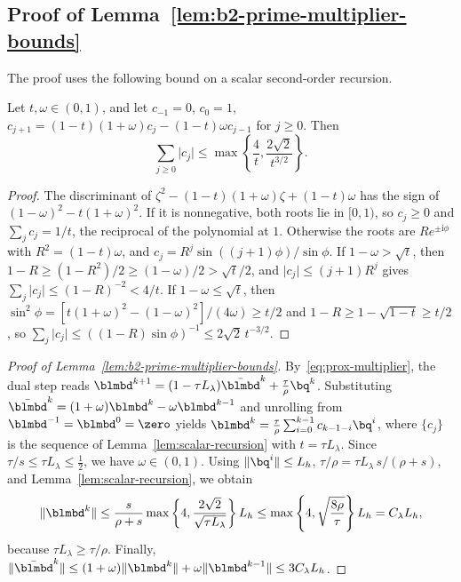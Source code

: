 \subsection{Proof of Lemma~\ref{lem:b2-prime-multiplier-bounds}}
\label{app:b2-prime-multiplier-bounds}

The proof uses the following bound on a scalar second-order recursion.

\begin{lemma}
\label{lem:scalar-recursion}
Let \(t,\omega\in(0,1)\), and let \(c_{-1}=0\), \(c_0=1\),
\(c_{j+1}=(1-t)(1+\omega)c_j-(1-t)\omega c_{j-1}\) for \(j\ge0\). Then
\[
    \sum_{j\ge0}\lvert c_j\rvert
    \le\max\left\{\frac4t,\frac{2\sqrt2}{t^{3/2}}\right\}.
\]
\end{lemma}

\begin{proof}
The discriminant of \(\zeta^2-(1-t)(1+\omega)\zeta+(1-t)\omega\) has the
sign of \((1-\omega)^2-t(1+\omega)^2\). If it is nonnegative, both roots
lie in \([0,1)\), so \(c_j\ge0\) and \(\sum_jc_j=1/t\), the reciprocal of
the polynomial at \(1\). Otherwise the roots are \(Re^{\pm\mathrm i\phi}\)
with \(R^2=(1-t)\omega\), and \(c_j=R^j\sin((j+1)\phi)/\sin\phi\).
If \(1-\omega>\sqrt t\), then \(1-R\ge(1-R^2)/2\ge(1-\omega)/2>\sqrt t/2\),
and \(\lvert c_j\rvert\le(j+1)R^j\) gives
\(\sum_j\lvert c_j\rvert\le(1-R)^{-2}<4/t\).
If \(1-\omega\le\sqrt t\), then
\(\sin^2\phi=[t(1+\omega)^2-(1-\omega)^2]/(4\omega)\ge t/2\) and
\(1-R\ge1-\sqrt{1-t}\ge t/2\), so
\(\sum_j\lvert c_j\rvert\le((1-R)\sin\phi)^{-1}\le2\sqrt2\,t^{-3/2}\).
\end{proof}

\begin{proof}[Proof of Lemma~\ref{lem:b2-prime-multiplier-bounds}]
By~\eqref{eq:prox-multiplier}, the dual step reads
\(\blmbd^{k+1}=(1-\tau L_\lambda)\bar{\blmbd}^k+\frac{\tau}{\rho}\bq^k\).
Substituting \(\bar{\blmbd}^k=(1+\omega)\blmbd^k-\omega\blmbd^{k-1}\) and
unrolling from \(\blmbd^{-1}=\blmbd^0=\zero\) yields
\(\blmbd^k=\frac{\tau}{\rho}\sum_{i=0}^{k-1}c_{k-1-i}\bq^i\), where
\(\{c_j\}\) is the sequence of Lemma~\ref{lem:scalar-recursion} with
\(t=\tau L_\lambda\). Since \(\tau/s\le\tau L_\lambda\le\frac12\), we have
\(\omega\in(0,1)\). Using \(\|\bq^i\|\le L_h\),
\(\tau/\rho=\tau L_\lambda\,s/(\rho+s)\), and
Lemma~\ref{lem:scalar-recursion}, we obtain
\[
    \|\blmbd^k\|
    \le\frac{s}{\rho+s}
    \max\left\{4,\frac{2\sqrt2}{\sqrt{\tau L_\lambda}}\right\}L_h
    \le\max\left\{4,\sqrt{\frac{8\rho}{\tau}}\right\}L_h
    =C_\lambda L_h,
\]
because \(\tau L_\lambda\ge\tau/\rho\). Finally,
\(\|\bar{\blmbd}^k\|\le(1+\omega)\|\blmbd^k\|+\omega\|\blmbd^{k-1}\|
\le3C_\lambda L_h\).
\end{proof}

